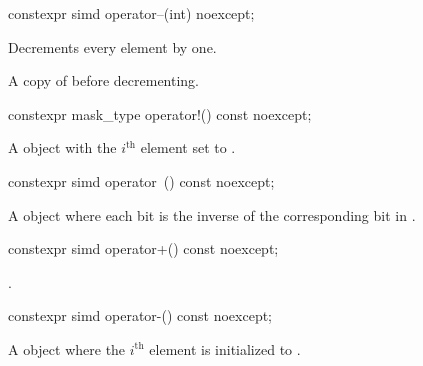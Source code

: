 \begin{itemdecl}
constexpr simd operator--(int) noexcept;
\end{itemdecl}

\begin{itemdescr}
  \pnum{}

  \pnum\effects
  Decrements every element by one.

  \pnum\returns
  A copy of  before decrementing.
\end{itemdescr}

\begin{itemdecl}
constexpr mask_type operator!() const noexcept;
\end{itemdecl}

\begin{itemdescr}
  \pnum{}

  \pnum\returns
  A  object with the $i^\text{th}$ element set to  \foralli.
\end{itemdescr}

\begin{itemdecl}
constexpr simd operator~() const noexcept;
\end{itemdecl}

\begin{itemdescr}
  \pnum{}

  \pnum\returns
  A  object where each bit is the inverse of the corresponding bit in .
\end{itemdescr}

\begin{itemdecl}
constexpr simd operator+() const noexcept;
\end{itemdecl}

\begin{itemdescr}
  \pnum{}

  \pnum\returns
  .
\end{itemdescr}

\begin{itemdecl}
constexpr simd operator-() const noexcept;
\end{itemdecl}

\begin{itemdescr}
  \pnum{}

  \pnum\returns
  A  object where the $i^\text{th}$ element is initialized to  \foralli.
\end{itemdescr}

